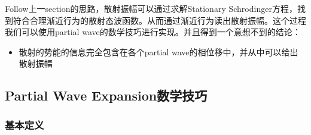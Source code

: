 Follow上一section的思路，散射振幅可以通过求解Stationary
Schrodinger方程，找到符合合理渐近行为的散射态波函数。从而通过渐近行为读出散射振幅。这个过程我们可以使用partial
wave的数学技巧进行实现。并且得到一个意想不到的结论：
\begin{itemize}
  \item 散射的势能的信息完全包含在各个partial wave的相位移中，并从中可以给出散射振幅
\end{itemize}


\subsection{Partial Wave Expansion数学技巧}

\subsubsection{基本定义}
\bigskip
{}

